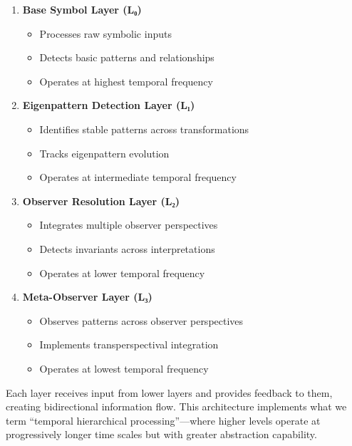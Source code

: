 \documentclass[12pt]{article}
\providecommand{\tightlist}{%
  \setlength{\itemsep}{0pt}\setlength{\parskip}{0pt}}
\begin{document}
\begin{enumerate}
\def\labelenumi{\arabic{enumi}.}
\item
  \textbf{Base Symbol Layer (L₀)}

  \begin{itemize}
  \tightlist
  \item
    Processes raw symbolic inputs
  \item
    Detects basic patterns and relationships
  \item
    Operates at highest temporal frequency
  \end{itemize}
\item
  \textbf{Eigenpattern Detection Layer (L₁)}

  \begin{itemize}
  \tightlist
  \item
    Identifies stable patterns across transformations
  \item
    Tracks eigenpattern evolution
  \item
    Operates at intermediate temporal frequency
  \end{itemize}
\item
  \textbf{Observer Resolution Layer (L₂)}

  \begin{itemize}
  \tightlist
  \item
    Integrates multiple observer perspectives
  \item
    Detects invariants across interpretations
  \item
    Operates at lower temporal frequency
  \end{itemize}
\item
  \textbf{Meta-Observer Layer (L₃)}

  \begin{itemize}
  \tightlist
  \item
    Observes patterns across observer perspectives
  \item
    Implements transperspectival integration
  \item
    Operates at lowest temporal frequency
  \end{itemize}
\end{enumerate}

Each layer receives input from lower layers and provides feedback to
them, creating bidirectional information flow. This architecture
implements what we term ``temporal hierarchical processing''---where
higher levels operate at progressively longer time scales but with
greater abstraction capability.
\end{document}
